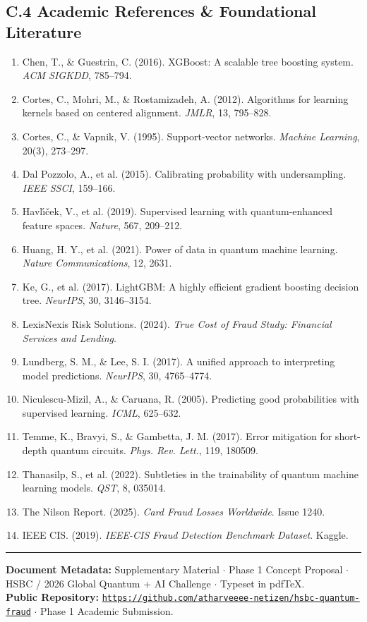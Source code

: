 \documentclass[10pt,a4paper]{article}
\begin{document}
\subsection*{C.4 Academic References \& Foundational Literature}
\begin{enumerate}[leftmargin=*,itemsep=0pt,topsep=0pt]
\item Chen, T., \& Guestrin, C. (2016). XGBoost: A scalable tree boosting system. \textit{ACM SIGKDD}, 785--794.
\item Cortes, C., Mohri, M., \& Rostamizadeh, A. (2012). Algorithms for learning kernels based on centered alignment. \textit{JMLR}, 13, 795--828.
\item Cortes, C., \& Vapnik, V. (1995). Support-vector networks. \textit{Machine Learning}, 20(3), 273--297.
\item Dal Pozzolo, A., et al. (2015). Calibrating probability with undersampling. \textit{IEEE SSCI}, 159--166.
\item Havl{\'\i}{\v{c}}ek, V., et al. (2019). Supervised learning with quantum-enhanced feature spaces. \textit{Nature}, 567, 209--212.
\item Huang, H. Y., et al. (2021). Power of data in quantum machine learning. \textit{Nature Communications}, 12, 2631.
\item Ke, G., et al. (2017). LightGBM: A highly efficient gradient boosting decision tree. \textit{NeurIPS}, 30, 3146--3154.
\item LexisNexis Risk Solutions. (2024). \textit{True Cost of Fraud Study: Financial Services and Lending}.
\item Lundberg, S. M., \& Lee, S. I. (2017). A unified approach to interpreting model predictions. \textit{NeurIPS}, 30, 4765--4774.
\item Niculescu-Mizil, A., \& Caruana, R. (2005). Predicting good probabilities with supervised learning. \textit{ICML}, 625--632.
\item Temme, K., Bravyi, S., \& Gambetta, J. M. (2017). Error mitigation for short-depth quantum circuits. \textit{Phys. Rev. Lett.}, 119, 180509.
\item Thanasilp, S., et al. (2022). Subtleties in the trainability of quantum machine learning models. \textit{QST}, 8, 035014.
\item The Nilson Report. (2025). \textit{Card Fraud Losses Worldwide}. Issue 1240.
\item IEEE CIS. (2019). \textit{IEEE-CIS Fraud Detection Benchmark Dataset}. Kaggle.
\end{enumerate}

\vspace{1.5pt}
\noindent\rule{\linewidth}{0.4pt}
\vspace{1pt}
{\color{darkslate}
\textbf{Document Metadata:} Supplementary Material $\cdot$ Phase 1 Concept Proposal $\cdot$ HSBC / 2026 Global Quantum + AI Challenge $\cdot$ Typeset in pdf\TeX.\\
\textbf{Public Repository:} \href{https://github.com/atharveeee-netizen/hsbc-quantum-fraud}{\texttt{https://github.com/atharveeee-netizen/hsbc-quantum-fraud}} $\cdot$ Phase 1 Academic Submission.
}
\end{document}
